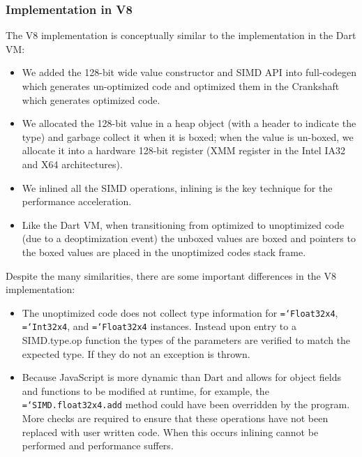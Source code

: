 \documentclass[preprint]{sigplanconf}
\newcommand{\ttt}[1]{{\texttt{\hyphenchar\font=`\-\relax #1}}}%
\begin{document}
\subsubsection{Implementation in V8}

The V8 implementation is conceptually similar to the implementation in the Dart
VM:

\begin{itemize}
\item
We added the 128-bit wide value constructor and SIMD API into full-codegen which
generates un-optimized code and optimized them in the Crankshaft which generates
optimized code.

\item
We allocated the 128-bit value in a heap object (with a header to indicate the
type) and garbage collect it when it is boxed; when the value is un-boxed, we
allocate it into a hardware 128-bit register (XMM register in the Intel IA32 and
X64 architectures).

\item
We inlined all the SIMD operations, inlining is the key technique for the
performance acceleration.

\item
Like the Dart VM, when transitioning from optimized to unoptimized code (due to
a deoptimization event) the unboxed values are boxed and pointers to the boxed
values are placed in the unoptimized codes stack frame.

\end{itemize}

Despite the many similarities, there are some important differences in the V8
implementation:

\begin{itemize}
\item
The unoptimized code does not collect type information for \ttt{Float32x4},
\ttt{Int32x4}, and \ttt{Float32x4} instances. Instead upon entry to a
SIMD.type.op function the types of the parameters are verified to match the
expected type. If they do not an exception is thrown.

\item
Because JavaScript is more dynamic than Dart and allows for object fields and
functions to be modified at runtime, for example, the \ttt{SIMD.float32x4.add}
method could have been overridden by the program. More checks are required to
ensure that these operations have not been replaced with user written code. When
this occurs inlining cannot be performed and performance suffers.

\end{itemize}
\end{document}
